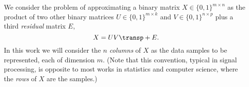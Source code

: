 \documentclass[twocolumn]{IEEEtran}
\begin{document}
We consider the problem of approximating a binary matrix $X \in \{0,1\}^{m{\times}n}$ as the product of two other binary matrices $U \in \{0,1\}^{m{\times}k}$ and $V \in \{0,1\}^{n{\times}p}$ plus a third \emph{residual} matrix $E$,
\begin{equation}
X = UV\transp + E.
\label{eq:mf}
\end{equation}
In this work we will consider the $n$ \emph{columns} of $X$ as the data samples to be represented, each of dimension $m$. (Note that this convention, typical in signal processing, is opposite to most works in statistics and computer science, where the \emph{rows} of $X$ are the samples.)
%
\end{document}
